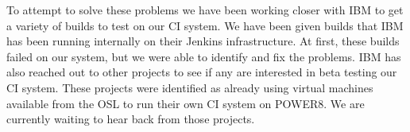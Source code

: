 \documentclass[10pt,onecolumn,journal,draftclsnofoot]{IEEEtran}
\begin{document}
To attempt to solve these problems we have been working closer with IBM to get a variety of builds to test on our CI system.
We have been given builds that IBM has been running internally on their Jenkins infrastructure.
At first, these builds failed on our system, but we were able to identify and fix the problems.
IBM has also reached out to other projects to see if any are interested in beta testing our CI system.
These projects were identified as already using virtual machines available from the OSL to run their own CI system on POWER8.
We are currently waiting to hear back from those projects.
\end{document}
